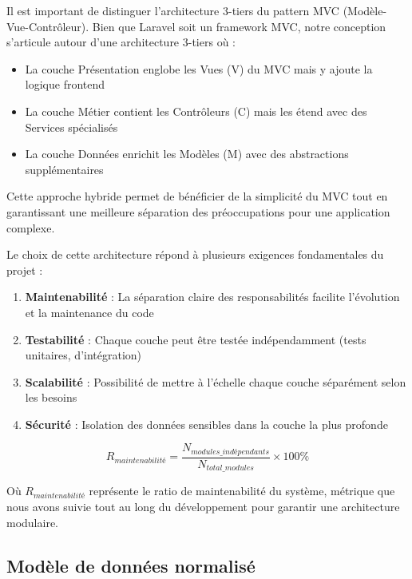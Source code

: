 \documentclass[french,12pt]{report} %
\begin{document}
\begin{definitionbox}
Il est important de distinguer l'architecture 3-tiers du pattern MVC (Modèle-Vue-Contrôleur). Bien que Laravel soit un framework MVC, notre conception s'articule autour d'une architecture 3-tiers où :
\begin{itemize}
    \item La couche Présentation englobe les Vues (V) du MVC mais y ajoute la logique frontend
    \item La couche Métier contient les Contrôleurs (C) mais les étend avec des Services spécialisés
    \item La couche Données enrichit les Modèles (M) avec des abstractions supplémentaires
\end{itemize}
Cette approche hybride permet de bénéficier de la simplicité du MVC tout en garantissant une meilleure séparation des préoccupations pour une application complexe.
\end{definitionbox}

Le choix de cette architecture répond à plusieurs exigences fondamentales du projet :

\begin{enumerate}
    \item \textbf{Maintenabilité} : La séparation claire des responsabilités facilite l'évolution et la maintenance du code
    \item \textbf{Testabilité} : Chaque couche peut être testée indépendamment (tests unitaires, d'intégration)
    \item \textbf{Scalabilité} : Possibilité de mettre à l'échelle chaque couche séparément selon les besoins
    \item \textbf{Sécurité} : Isolation des données sensibles dans la couche la plus profonde
\end{enumerate}

\begin{equation}
R_{maintenabilité} = \frac{N_{modules\_indépendants}}{N_{total\_modules}} \times 100\%
\end{equation}

Où $R_{maintenabilité}$ représente le ratio de maintenabilité du système, métrique que nous avons suivie tout au long du développement pour garantir une architecture modulaire.

\subsection{Modèle de données normalisé}
\end{document}
